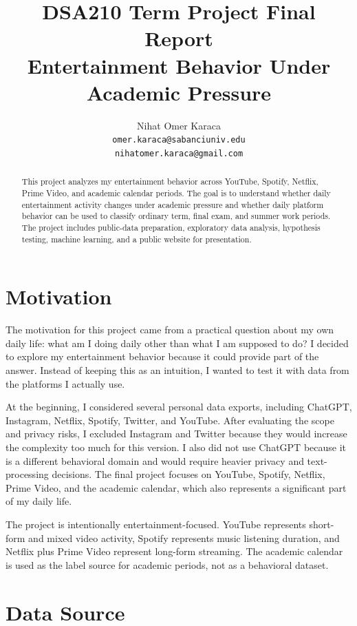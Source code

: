 \documentclass[11pt,a4paper]{article}
\title{\textbf{DSA210 Term Project Final Report}\\
\large Entertainment Behavior Under Academic Pressure}
\author{
Nihat Omer Karaca\\
\texttt{omer.karaca@sabanciuniv.edu}\\
\texttt{nihatomer.karaca@gmail.com}
}
\date{}
\begin{document}
\maketitle

\begin{abstract}
This project analyzes my entertainment behavior across YouTube, Spotify, Netflix, Prime Video, and academic calendar periods. The goal is to understand whether daily entertainment activity changes under academic pressure and whether daily platform behavior can be used to classify ordinary term, final exam, and summer work periods. The project includes public-data preparation, exploratory data analysis, hypothesis testing, machine learning, and a public website for presentation.
\end{abstract}

\tableofcontents
\newpage

\section{Motivation}

The motivation for this project came from a practical question about my own daily life: what am I doing daily other than what I am supposed to do? I decided to explore my entertainment behavior because it could provide part of the answer. Instead of keeping this as an intuition, I wanted to test it with data from the platforms I actually use.

At the beginning, I considered several personal data exports, including ChatGPT, Instagram, Netflix, Spotify, Twitter, and YouTube. After evaluating the scope and privacy risks, I excluded Instagram and Twitter because they would increase the complexity too much for this version. I also did not use ChatGPT because it is a different behavioral domain and would require heavier privacy and text-processing decisions. The final project focuses on YouTube, Spotify, Netflix, Prime Video, and the academic calendar, which also represents a significant part of my daily life.

The project is intentionally entertainment-focused. YouTube represents short-form and mixed video activity, Spotify represents music listening duration, and Netflix plus Prime Video represent long-form streaming. The academic calendar is used as the label source for academic periods, not as a behavioral dataset.

\section{Data Source}
\end{document}

